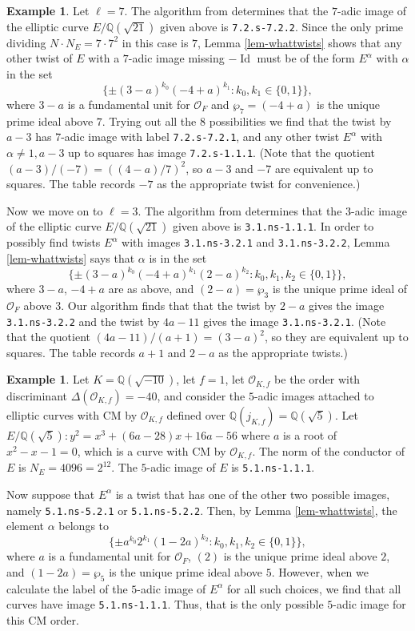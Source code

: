 \documentclass[11pt]{amsart}
\theoremstyle{definition}
\newtheorem{example}[defn]{Example}
\newcommand{\Q}{\mathbb Q}
\newcommand{\OF}{\mathcal{O}_F}
\newcommand{\Of}{\mathcal{O}_{K,f}}
\begin{document}
\begin{example}
  Let $\ell=7$. The algorithm from \cite{elladic} determines that the $7$-adic image of the elliptic curve $E/\Q(\sqrt{21})$ given above is \texttt{7.2.s-7.2.2}. Since the only prime dividing $N\cdot N_E=7\cdot 7^2$ in this case is $7$, Lemma \ref{lem-whattwists} shows that any other twist of $E$ with a $7$-adic image missing $-\operatorname{Id}$ must be of the form $E^\alpha$ with $\alpha$ in the set
  $$\{\pm (3-a)^{k_0} (-4+a)^{k_1} : k_0,k_1 \in \{0,1\} \},$$
  where $3-a$ is a fundamental unit for $\OF$ and $\wp_7 = (-4+a)$ is the unique prime ideal above $7$. Trying out all the $8$ possibilities we find that the twist by $a-3$ has $7$-adic image with label \texttt{7.2.s-7.2.1}, and any other twist $E^\alpha$ with $\alpha \neq 1, a-3$ up to squares has image \texttt{7.2.s-1.1.1}. (Note that the quotient $(a-3)/(-7) = ((4-a)/7)^2$, so $a-3$ and $-7$ are equivalent up to squares. The table records $-7$ as the appropriate twist for convenience.)

  Now we move on to $\ell=3$. The algorithm from \cite{elladic} determines that the $3$-adic image of the elliptic curve $E/\Q(\sqrt{21})$ given above is \texttt{3.1.ns-1.1.1}. In order to possibly find twists $E^\alpha$ with images \texttt{3.1.ns-3.2.1} and \texttt{3.1.ns-3.2.2}, Lemma \ref{lem-whattwists} says that $\alpha$ is in the set 
  $$\{\pm (3-a)^{k_0} (-4+a)^{k_1}(2-a)^{k_2} : k_0,k_1,k_2 \in \{0,1\} \},$$
  where $3-a$, $-4+a$ are as above, and $(2-a)=\wp_3$ is the unique prime ideal of $\OF$ above $3$. Our algorithm finds that that the twist by $2-a$ gives the image \texttt{3.1.ns-3.2.2} and the twist by $4a-11$ gives the image \texttt{3.1.ns-3.2.1}. (Note that the quotient $(4a-11)/(a+1) = (3-a)^2$, so they are equivalent up to squares. The table records $a+1$ and $2-a$ as the appropriate twists.) 
\end{example}

\begin{example}\label{ex-method2}
   Let $K=\Q(\sqrt{-10})$, let $f=1$, let $\Of$ be the order with discriminant $\Delta(\Of)=-40$, and consider the $5$-adic images attached to elliptic curves with CM by $\Of$ defined over $\Q(j_{K,f})=\Q(\sqrt{5})$.  Let $E/\Q(\sqrt{5}): y^2 = x^3 +(6a-28)x +16a - 56$ where $a$ is a root of $x^2-x-1=0$, which is a curve with CM by $\Of$. The norm of the conductor of $E$ is $N_E=4096=2^{12}$. The $5$-adic image of $E$ is \texttt{5.1.ns-1.1.1}. 
   
   
   Now suppose that $E^\alpha$ is a twist that has one of the other two  possible images, namely  \texttt{5.1.ns-5.2.1} or \texttt{5.1.ns-5.2.2}. Then, by Lemma \ref{lem-whattwists}, the element $\alpha$ belongs to 
   $$\{\pm a^{k_0} 2^{k_1}(1-2a)^{k_2} : k_0,k_1,k_2 \in \{0,1\} \},$$
   where $a$ is a fundamental unit for $\OF$, $(2)$ is the unique prime ideal above $2$, and $(1-2a)=\wp_5$ is the unique prime ideal above $5$.   However, when we calculate the label of the $5$-adic image of $E^\alpha$ for all such choices, we find that all curves have image \texttt{5.1.ns-1.1.1}. Thus, that is the only possible $5$-adic image for this CM order.
\end{example}
\end{document}
